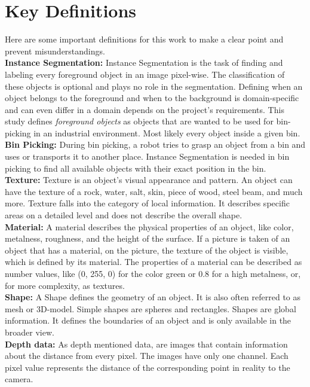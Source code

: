 	\section{Key Definitions}
	\label{sec:key-definitions}
		Here are some important definitions for this work to make a clear point and prevent misunderstandings.\\
		\textbf{Instance Segmentation:} Instance Segmentation is the task of finding and labeling every foreground object in an image pixel-wise. The classification of these objects is optional and plays no role in the segmentation. Defining when an object belongs to the foreground and when to the background is domain-specific and can even differ in a domain depends on the project's requirements. This study defines \textit{foreground objects} as objects that are wanted to be used for bin-picking in an industrial environment. Most likely every object inside a given bin.\\
		\textbf{Bin Picking:} During bin picking, a robot tries to grasp an object from a bin and uses or transports it to another place. Instance Segmentation is needed in bin picking to find all available objects with their exact position in the bin.\\
		\textbf{Texture:} Texture is an object's visual appearance and pattern. An object can have the texture of a rock, water, salt, skin, piece of wood, steel beam, and much more. Texture falls into the category of local information. It describes specific areas on a detailed level and does not describe the overall shape.\\
		\textbf{Material:} A material describes the physical properties of an object, like color, metalness, roughness, and the height of the surface. If a picture is taken of an object that has a material, on the picture, the texture of the object is visible, which is defined by its material. The properties of a material can be described as number values, like (0, 255, 0) for the color green or 0.8 for a high metalness, or, for more complexity, as textures.\\
		\textbf{Shape:} A Shape defines the geometry of an object. It is also often referred to as mesh or 3D-model. Simple shapes are spheres and rectangles. Shapes are global information. It defines the boundaries of an object and is only available in the broader view.\\
		\textbf{Depth data:} As depth mentioned data, are images that contain information about the distance from every pixel. The images have only one channel. Each pixel value represents the distance of the corresponding point in reality to the camera.\\
